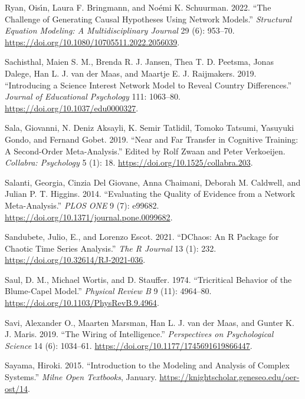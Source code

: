 \documentclass[
  a4paper,
  DIV=11,
  numbers=noendperiod,
  oneside]{scrreprt}
\newlength{\cslhangindent}
\newenvironment{CSLReferences}[2] %
 {\begin{list}{}{%
  \setlength{\itemindent}{0pt}
  \setlength{\leftmargin}{0pt}
  \setlength{\parsep}{0pt}
  \ifodd #1
   \setlength{\leftmargin}{\cslhangindent}
   \setlength{\itemindent}{-1\cslhangindent}
  \fi
  \setlength{\itemsep}{#2\baselineskip}}}
 {\end{list}}
\begin{document}
\begin{CSLReferences}{1}{0}
Ryan, Oisı́n, Laura F. Bringmann, and Noémi K. Schuurman. 2022. {``The
{Challenge} of {Generating Causal Hypotheses Using Network Models}.''}
\emph{Structural Equation Modeling: A Multidisciplinary Journal} 29 (6):
953--70. \url{https://doi.org/10.1080/10705511.2022.2056039}.

Sachisthal, Maien S. M., Brenda R. J. Jansen, Thea T. D. Peetsma, Jonas
Dalege, Han L. J. van der Maas, and Maartje E. J. Raijmakers. 2019.
{``Introducing a Science Interest Network Model to Reveal Country
Differences.''} \emph{Journal of Educational Psychology} 111: 1063--80.
\url{https://doi.org/10.1037/edu0000327}.

Sala, Giovanni, N. Deniz Aksayli, K. Semir Tatlidil, Tomoko Tatsumi,
Yasuyuki Gondo, and Fernand Gobet. 2019. {``Near and {Far Transfer} in
{Cognitive Training}: {A Second-Order Meta-Analysis}.''} Edited by Rolf
Zwaan and Peter Verkoeijen. \emph{Collabra: Psychology} 5 (1): 18.
\url{https://doi.org/10.1525/collabra.203}.

Salanti, Georgia, Cinzia Del Giovane, Anna Chaimani, Deborah M.
Caldwell, and Julian P. T. Higgins. 2014. {``Evaluating the Quality of
Evidence from a Network Meta-Analysis.''} \emph{PLOS ONE} 9 (7): e99682.
\url{https://doi.org/10.1371/journal.pone.0099682}.

Sandubete, Julio, E., and Lorenzo Escot. 2021. {``{DChaos}: {An R
Package} for {Chaotic Time Series Analysis}.''} \emph{The R Journal} 13
(1): 232. \url{https://doi.org/10.32614/RJ-2021-036}.

Saul, D. M., Michael Wortis, and D. Stauffer. 1974. {``Tricritical
Behavior of the {Blume-Capel} Model.''} \emph{Physical Review B} 9 (11):
4964--80. \url{https://doi.org/10.1103/PhysRevB.9.4964}.

Savi, Alexander O., Maarten Marsman, Han L. J. van der Maas, and Gunter
K. J. Maris. 2019. {``The {Wiring} of {Intelligence}.''}
\emph{Perspectives on Psychological Science} 14 (6): 1034--61.
\url{https://doi.org/10.1177/1745691619866447}.

Sayama, Hiroki. 2015. {``Introduction to the Modeling and Analysis of
Complex Systems.''} \emph{Milne Open Textbooks}, January.
\url{https://knightscholar.geneseo.edu/oer-ost/14}.


\end{CSLReferences}
\end{document}
